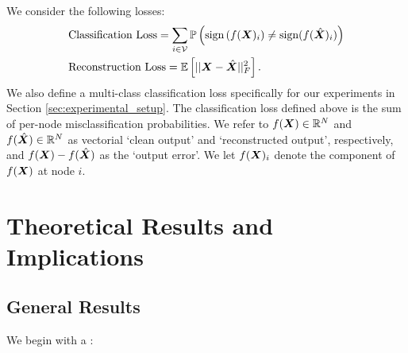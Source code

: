 We consider the following losses:
\begin{align}
    &\bs{\text{Classification Loss}} = {\sum_{i \in \set{V}}\prob{\text{sign}\left(f(\matr{X})_{i}\right) \neq \text{sign}(f(\hat{\matr{X}})_{i})}} \\
    &\text{Reconstruction Loss} = \expect{||{\vect{X} - \hat{\vect{X}}}||^{2}_{F}}.
\end{align}
{We also define a multi-class classification loss specifically for our experiments in Section} \ref{sec:experimental_setup}.
The classification loss defined above is the sum of per-node misclassification probabilities. We refer to $f(\bm{X}) \in \mathbb{R}^{N}$ and $f(\hat{\bm{X}}) \in \mathbb{R}^{N}$ as vectorial `clean output' and `reconstructed output', respectively, and $f(\bm{X}) - f(\hat{\bm{X}})$ as the `output error'. We let $f(\bm{X})_{i}$ denote the component of $f(\bm{X})$ at node $i$. %




\section{Theoretical Results and Implications}
\subsection{General Results}
\label{sec:Gen_Theory}
We begin with a :

